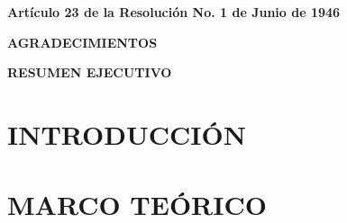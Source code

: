 \documentclass{report}
\begin{document}
    
    
    
    \setcounter{page}{4}
	\begin{flushleft}
		 \label{artículo}
		\vspace*{2cm}
		\large{\textbf{Artículo 23 de la Resolución No. 1 de Junio de 1946}}
	\end{flushleft}
	
	\clearpage

	\begin{center}
		 \label{glads}
		\large{\textbf{AGRADECIMIENTOS}}
	\end{center}
	
	\clearpage
    
    \begin{center}
		 \label{resumenejecutivo}
		\large{\textbf{RESUMEN EJECUTIVO}}
	\end{center}
	
	\clearpage

    \setlength{\cftbeforetoctitleskip}{-0.3cm}
	\renewcommand{\cfttoctitlefont}{\large}
	\renewcommand{\contentsname}{\textbf{CONTENIDO}}
	
	\tableofcontents 
	\newpage
	\renewcommand\cftloftitlefont{\large}
	\renewcommand{\listfigurename}{\textbf{ÍNDICE DE FIGURAS}}
	{%
		\let\oldnumberline\numberline%
		\renewcommand{\numberline}{\figurename~\oldnumberline}%
		\listoffigures%
	}
	\newpage
	\renewcommand\cftlottitlefont{\large}
	\renewcommand{\listtablename}{\textbf{ÍNDICE DE TABLAS}}
	{%
		\let\oldnumberline\numberline%
		\renewcommand{\numberline}{\tablename~\oldnumberline}%
		\listoftables%
	}
	\newpage
	\chapternumberfont{\huge}
	\chaptertitlefont{\large}
	\chapter{INTRODUCCIÓN} \label{intr}
	
	\chapter{MARCO TEÓRICO} \label{cap2}
	
\end{document}
